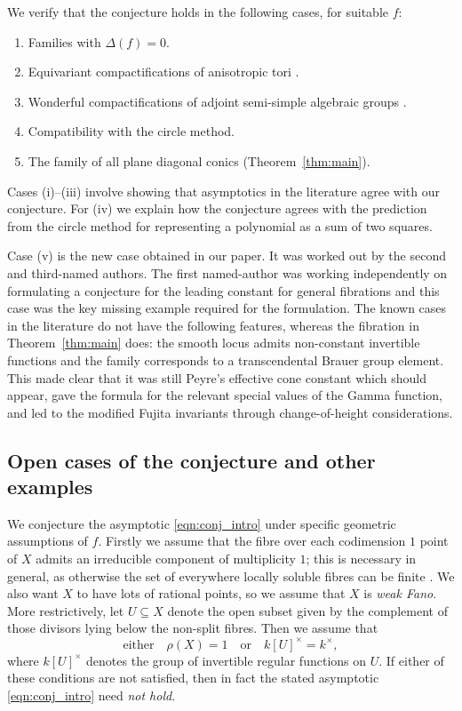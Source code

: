 \documentclass[a4paper,12pt,reqno]{amsart}
\numberwithin{equation}{section} \numberwithin{figure}{section}
\renewcommand{\#}{\sharp}
\theoremstyle{definition}
\numberwithin{lemma}{section}
\begin{document}
We verify that the conjecture holds in the following cases, for suitable $f$:

\begin{enumerate}
	\item[(i)] Families with $\Delta(f) = 0$.
	\item[(ii)] Equivariant compactifications of anisotropic tori \cite{Lou18}.
	\item[(iii)] 
	Wonderful compactifications of adjoint semi-simple algebraic groups \cite{LTBT20}.
	\item[(iv)] Compatibility with the circle method.
	\item[(v)] The family of all plane diagonal conics (Theorem~\ref{thm:main}).
\end{enumerate}

Cases (i)--(iii) involve showing that asymptotics in the literature agree with our conjecture. For (iv) we explain how the conjecture agrees with the prediction from the circle method for representing a polynomial as a sum of two squares.



Case (v) is the new 
case obtained in our paper. It was 
 worked out 
by the second and third-named authors.
The  first named-author was working independently on formulating  a  conjecture for the  leading constant for general fibrations
and this case 
  was the key missing example required for the   formulation.
The known  cases in the literature do not have the following features, whereas the fibration in Theorem~\ref{thm:main}
does:
the smooth locus admits non-constant invertible functions and the family corresponds to a transcendental Brauer group element.
 This made clear that it was still Peyre's effective cone constant which should appear, gave the formula for the relevant special values of the Gamma function, and led to the modified Fujita invariants through change-of-height considerations.



\subsection{Open cases of the conjecture and other examples}
We  conjecture the asymptotic \eqref{eqn:conj_intro} under  
specific
 geometric assumptions of $f$. Firstly we assume that the fibre over each codimension $1$ point of $X$ admits an irreducible component of multiplicity $1$; this is necessary in general, as otherwise the set of everywhere locally soluble fibres can be finite \cite[Thm.~1.4]{LM19}. We also want $X$ to have lots of rational points, so we assume that $X$ is \emph{weak Fano}. More restrictively, let $U \subseteq X$ denote the open subset given by the complement of those divisors lying below the non-split fibres. Then we assume that
\begin{equation} \label{eqn:assump_geometric}
	\text{either} \quad \rho(X) = 1 \quad \text{or} \quad k[U]^\times = k^\times,
\end{equation}
where $k[U]^\times$ denotes the group of invertible regular functions on $U$. If either of these conditions are not satisfied, then in fact the stated asymptotic \eqref{eqn:conj_intro} need \emph{not hold}.
\end{document}
